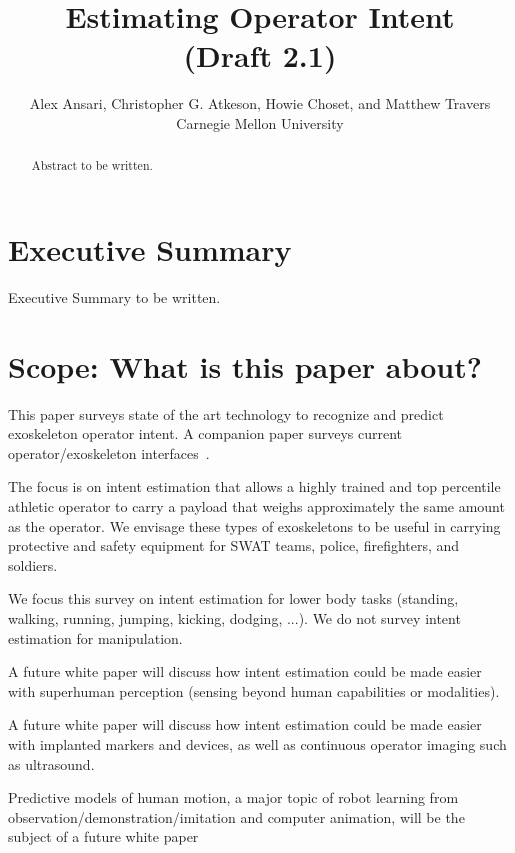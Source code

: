 \documentclass[letterpaper,12pt,fullpage]{article}
\begin{document}
\title{Estimating Operator Intent\\
(Draft 2.1)}

\author{Alex Ansari, Christopher G. Atkeson, Howie Choset, and Matthew Travers\\
Carnegie Mellon University}

\maketitle

\begin{abstract}
Abstract to be written.
\end{abstract}

\section{Executive Summary}

Executive Summary to be written.

\section{Scope: What is this paper about?}

This paper surveys state of the art technology to recognize
and predict exoskeleton
operator intent.
A companion paper surveys current operator/exoskeleton interfaces~\cite{}.

The focus is on intent estimation that allows a
highly trained and top percentile athletic 
operator to carry a payload that weighs approximately the same amount
as the operator. We envisage these types of exoskeletons to be useful
in carrying protective and safety equipment for SWAT teams, police,
firefighters, and soldiers. 

We focus this survey on intent estimation for lower body tasks (standing, walking,
running, jumping, kicking, dodging, ...).
We do not survey intent estimation for manipulation. 

A future white paper will discuss how intent estimation could be 
made easier with superhuman perception (sensing beyond human capabilities
or modalities).

A future white paper will discuss how intent estimation could be 
made easier with implanted markers and devices, as well as continuous
operator imaging such as ultrasound.

Predictive models of human motion, a major topic of robot learning from\\
observation/demonstration/imitation and computer animation,
will be the subject of a future white
paper~\cite{IEEE06913830,Bagnell}
\end{document}
